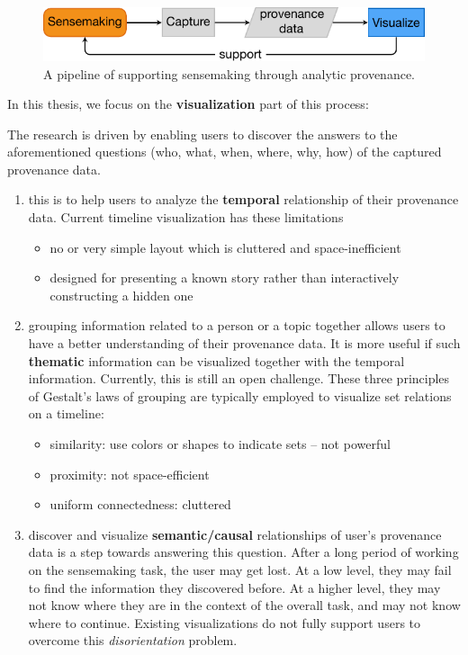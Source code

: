 \begin{figure}[ht]
	\centering
	\includegraphics[width=.8\linewidth]{workflow}
	\caption{A pipeline of supporting sensemaking through analytic provenance.}
	\label{fig:workflow}
\end{figure}

In this thesis, we focus on the \textbf{visualization} part of this process:
\begin{center}
\end{center}

The research is driven by enabling users to discover the answers to the aforementioned questions (who, what, when, where, why, how) of the captured provenance data.
\begin{enumerate}
	\item {} this is to help users to analyze the \textbf{temporal} relationship of their provenance data. Current timeline visualization has these limitations
	\begin{itemize}
		\item no or very simple layout which is cluttered and space-inefficient
		\item designed for presenting a known story rather than interactively constructing a hidden one
	\end{itemize} 
	\item {} grouping information related to a person or a topic together allows users to have a better understanding of their provenance data. It is more useful if such \textbf{thematic} information can be visualized together with the temporal information. Currently, this is still an open challenge. These three principles of Gestalt's laws of grouping are typically employed to visualize set relations on a timeline:
	\begin{itemize}
		\item similarity: use colors or shapes to indicate sets -- not powerful 
		\item proximity: not space-efficient
		\item uniform connectedness: cluttered
	\end{itemize} 
	\item {} discover and visualize \textbf{semantic/causal} relationships of user's provenance data is a step towards answering this question. After a long period of working on the sensemaking task, the user may get lost. At a low level, they may fail to find the information they discovered before. At a higher level, they may not know where they are in the context of the overall task, and may not know where to continue. Existing visualizations do not fully support users to overcome this \emph{disorientation} problem.
\end{enumerate}


